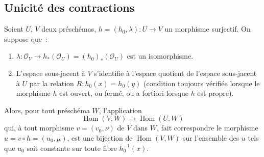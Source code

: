\subsection{Unicité des contractions}
\label{subsection:II.8.11-fr}

\begin{lemma}[8.11.1]
\label{II.8.11.1-fr}
Soient $U$, $V$ deux préschémas,
$h=(h_0,\lambda):U\to V$ un morphisme surjectif. On suppose que~:
\begin{enumerate}
  \item[$1^\circ$]
  $\lambda:\mathcal{O}_V\to h_*(\mathcal{O}_U)
  =(h_0)_*(\mathcal{O}_U)$ est un isomorphisme.
  \item[$2^\circ$] L'espace sous-jacent à $V$ s'identifie à l'espace quotient
  de l'espace sous-jacent à $U$ par la relation
  $R:h_0(x)=h_0(y)$ (condition toujours vérifiée lorsque le morphisme $h$ est
  ouvert, ou fermé, ou a fortiori lorsque $h$ est propre).
\end{enumerate}
Alors, pour tout préschéma $W$, l'application
\begin{equation}
\label{II.8.11.1.1-fr}
  \operatorname{Hom}(V,W)\longrightarrow\operatorname{Hom}(U,W)
\tag{8.11.1.1}
\end{equation}
qui, à tout morphisme $v=(v_0,\nu)$ de $V$ dans $W$, fait correspondre le
morphisme $u=v\circ h=(u_0,\mu)$, est une bijection de
$\operatorname{Hom}(V,W)$ sur l'ensemble des $u$ tels que $u_0$ soit
constante sur toute fibre $h_0^{-1}(x)$.
\end{lemma}

